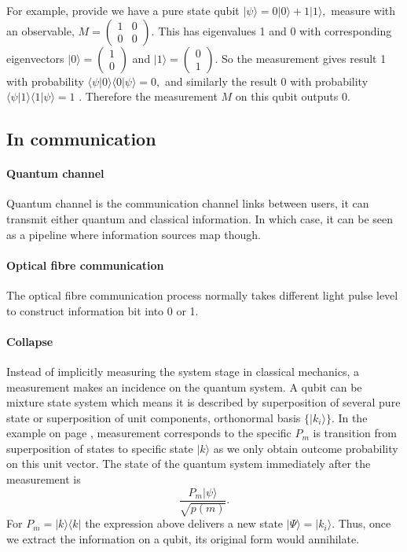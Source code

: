 \documentclass[12pt]{article}
\begin{document}
For example, provide we have a pure state qubit $|\psi\rangle=
0|0\rangle + 1|1\rangle,$ measure with an observable, $M=
\begin{pmatrix}
1& 0\\0&0
\end{pmatrix}.$ This has eigenvalues 1 and 0 with corresponding eigenvectors $|0\rangle=\begin{pmatrix}
1\\0
\end{pmatrix}$ and $
|1\rangle=\begin{pmatrix}
0\\1
\end{pmatrix}.$ So the measurement gives result 1 with probability $\langle\psi|0\rangle \langle0|\psi\rangle =0,$ and similarly the result 0 with probability $\langle\psi|1\rangle \langle1|\psi\rangle =1$ \cite[p.89]{nielsen2000quantum}. Therefore the measurement $M$ on this qubit outputs 0.
\subsection{In communication}
\paragraph{Quantum channel}
Quantum channel is the communication channel links between users, it can transmit either quantum and classical information. In which case, it can be seen as a pipeline where information sources map though.
\paragraph{Optical fibre communication}
The optical fibre communication process normally takes different light pulse level to construct information bit into 0 or 1.
\paragraph{Collapse}
Instead of implicitly measuring the system stage in classical mechanics, a measurement makes an incidence on the quantum system. A qubit can be mixture state system which means it is described by superposition of several pure state or superposition of unit components, orthonormal basis $\{|k_i\rangle\}$. In the example on page \pageref{Quantum measurement}, measurement corresponds to the specific $P_m$ is transition from superposition of states to specific state $|k\rangle$ as we only obtain outcome probability on this unit vector. The state of the quantum system immediately after the measurement is \cite[p.88]{nielsen2000quantum}
\[
	\frac{P_m|\psi\rangle}{\sqrt{p(m)}}.
\]
For $P_m=|k\rangle\langle k|$ the expression above delivers a new state $|\Psi\rangle=|k_i\rangle$. Thus, once we extract the information on a qubit, its original form would annihilate.
\end{document}
